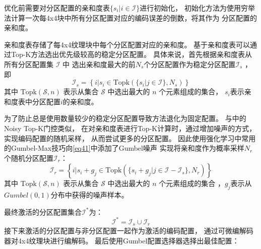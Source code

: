 优化前需要对分区配置的亲和度表$\{s_i|i\in\mathcal{I}\}$进行初始化，
初始化方法为使用穷举法计算一次每4x4块中所有分区配置对应的编码误差的倒数，将其作为
分区配置的亲和度。

亲和度表存储了每4x4纹理块中每个分区配置对应的亲和度。
基于亲和度表可以通过Top-K方法选出优先级较高的稳定分区配置。
具体来说，首先根据亲和度表从所有分区配置集 $\mathcal{I}$ 中
选出亲和度最大的前$N_s$个分区配置作为稳定分区配置$\mathcal{I}_s$ ，即
\begin{equation}
\label{eq41}
\mathcal{I}_s=\left\{i|s_i\in\text{Topk}(\{s_i|j\in\mathcal{I}\},N_s)\right\}
\end{equation}
其中 $\text{Topk}(\mathcal{S},n)$ 表示从集合 $\mathcal{S}$ 中选出最大的 $n$ 个元素组成的集合，
$s_i$表示亲和度表中分区配置$i$的亲和度。

为了防止总是使用数量较少的稳定分区配置导致方法退化为固定配置。
与中的Noisy Top-K门控类似，
在对亲和度表进行Top-K计算时，通过增加噪声的方式，实现编码配置的随机采样，
从而尝试更多的分区配置。
因此使用强化学习中常用的Gumbel-Max技巧\cite{jang2016categorical}向\eqref{eq41}中添加了Gumbel噪声\cite{jang2016categorical}
实现将亲和度作为概率采样$N_r$个随机分区配置$\mathcal{I}_r$：
\begin{equation}
\mathcal{I}_r=\left\{i|s_i+g_j\in\text{Topk}(\{s_i+g_j|j\in\mathcal{I}-\mathcal{I}_s\},N_r)\right\}
\end{equation}
其中 $\text{Topk}(\mathcal{S},n)$ 表示从集合 $\mathcal{S}$ 中选出最大的 $n$ 个元素组成的集合
，$g_j$表示从$Gumbel(0,1)$分布中获得的噪声样本。

最终激活的分区配置集合$\mathcal{I}^*$为：
\begin{equation}
\mathcal{I}^*=\mathcal{I}_{s}\cup\mathcal{I}_r
\end{equation}
接下来激活的分区配置与非分区配置一起作为激活的编码配置，
通过可微编解码器对4x4纹理块进行编解码。
最后使用Gumbel配置选择器选择出最佳配置：

